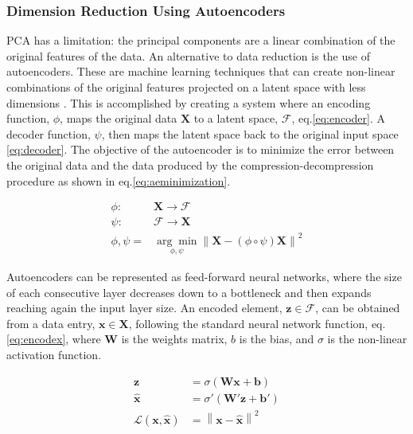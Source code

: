 \subsubsection{Dimension Reduction Using Autoencoders}
PCA has a limitation: the principal components are a linear combination of the original features of the data. An alternative to data reduction is the use of autoencoders. These are machine learning techniques that can create non-linear combinations of the original features projected on a latent space with less dimensions \citep{Hinton2006}. This is accomplished by creating a system where an encoding function, $\phi$, maps the original data $\boldsymbol{X}$ to a latent space, $\boldsymbol{\mathcal{F}}$, eq.\eqref{eq:encoder}. A decoder function, $\psi$, then maps the latent space back to the original input space \eqref{eq:decoder}. The objective of the autoencoder is to minimize the error between the original data and the data produced by the compression-decompression procedure as shown in eq.\eqref{eq:aeminimization}.

\begin{align}
\phi: & \boldsymbol{X} \rightarrow \boldsymbol{\mathcal{F}} \label{eq:encoder}\\
\psi: & \boldsymbol{\mathcal{F}} \rightarrow \boldsymbol{X} \label{eq:decoder} \\
\phi,\psi = & \underset{\phi,\psi}{\arg \min} \left\lVert \boldsymbol{X} - (\phi \circ \psi) \boldsymbol{X} \right\rVert^2 \label{eq:aeminimization}
\end{align}

Autoencoders can be represented as feed-forward neural networks, where the size of each consecutive layer decreases down to a bottleneck and then expands reaching again the input layer size. An encoded element, $\boldsymbol{z} \in \boldsymbol{\mathcal{F}}$, can be obtained from a data entry, $\boldsymbol{x} \in \boldsymbol{X}$, following the standard neural network function, eq.\eqref{eq:encodex}, where $\boldsymbol{W}$ is the weights matrix, $b$ is the bias, and $\sigma$ is the non-linear activation function.

\begin{align}
\boldsymbol{z} & = \sigma \left( \boldsymbol{W}\boldsymbol{x} + \boldsymbol{b} \right) \label{eq:encodex} \\
\boldsymbol{\hat{x}} & = \sigma' \left( \boldsymbol{W'}\boldsymbol{z} + \boldsymbol{b'} \right) \label{eq:decodez} \\ 
\mathcal{L}(\boldsymbol{x}, \boldsymbol{\hat{x}}) & =  \left\lVert \boldsymbol{x}- \boldsymbol{\hat{x}} \right\rVert^2 \label{eq:aeloss}
\end{align}

